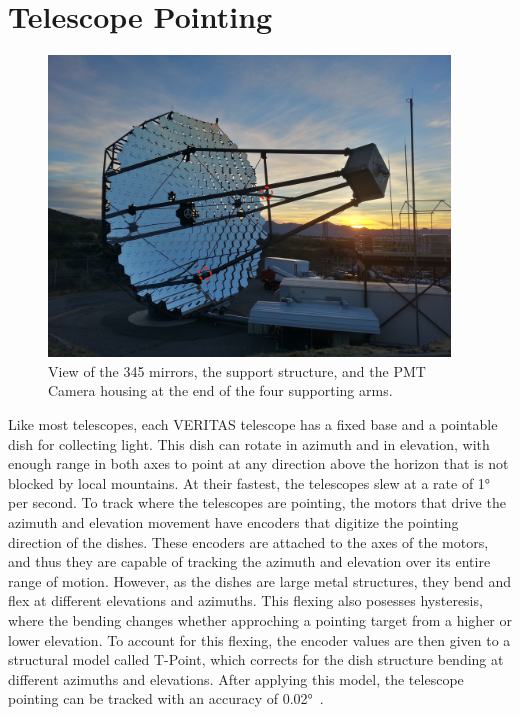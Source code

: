 \section{Telescope Pointing}\label{sec:telpoint}

\begin{figure}[ht]
  \centering
  \includegraphics[width=0.95\textwidth]{images/single_telescope}
  \caption[Single Veritas Telescope]{
    View of the 345 mirrors, the support structure, and the PMT Camera housing at the end of the four supporting arms.}
  \label{fig:davcottel}
\end{figure}

Like most telescopes, each VERITAS telescope has a fixed base and a pointable dish for collecting light.
This dish can rotate in azimuth and in elevation, with enough range in both axes to point at any direction above the horizon that is not blocked by local mountains.
At their fastest, the telescopes slew at a rate of \nicetilde{}\ang{1} per second.
To track where the telescopes are pointing, the motors that drive the azimuth and elevation movement have encoders that digitize the pointing direction of the dishes.
These encoders are attached to the axes of the motors, and thus they are capable of tracking the azimuth and elevation over its entire range of motion.
However, as the dishes are large metal structures, they bend and flex at different elevations and azimuths.
This flexing also posesses hysteresis, where the bending changes whether approching a pointing target from a higher or lower elevation.
To account for this flexing, the encoder values are then given to a structural model called T-Point, which corrects for the dish structure bending at different azimuths and elevations.
After applying this model, the telescope pointing can be tracked with an accuracy of \nicetilde{}\ang{0.02}~\cite{holder2008status}.

